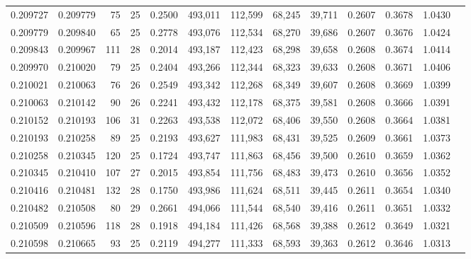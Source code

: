 \begin{tabular}{rrrrrrrrrrrrr}
0.209727 & 0.209779 &  75 &  25 &                                     0.2500 & 493,011 & 112,599 &  68,245 &  39,711 & 0.2607 & 0.3678 & 1.0430 \\
0.209779 & 0.209840 &  65 &  25 &                                     0.2778 & 493,076 & 112,534 &  68,270 &  39,686 & 0.2607 & 0.3676 & 1.0424 \\
0.209843 & 0.209967 & 111 &  28 &                                     0.2014 & 493,187 & 112,423 &  68,298 &  39,658 & 0.2608 & 0.3674 & 1.0414 \\
0.209970 & 0.210020 &  79 &  25 &                                     0.2404 & 493,266 & 112,344 &  68,323 &  39,633 & 0.2608 & 0.3671 & 1.0406 \\
0.210021 & 0.210063 &  76 &  26 &                                     0.2549 & 493,342 & 112,268 &  68,349 &  39,607 & 0.2608 & 0.3669 & 1.0399 \\
0.210063 & 0.210142 &  90 &  26 &                                     0.2241 & 493,432 & 112,178 &  68,375 &  39,581 & 0.2608 & 0.3666 & 1.0391 \\
0.210152 & 0.210193 & 106 &  31 &                                     0.2263 & 493,538 & 112,072 &  68,406 &  39,550 & 0.2608 & 0.3664 & 1.0381 \\
0.210193 & 0.210258 &  89 &  25 &                                     0.2193 & 493,627 & 111,983 &  68,431 &  39,525 & 0.2609 & 0.3661 & 1.0373 \\
0.210258 & 0.210345 & 120 &  25 &                                     0.1724 & 493,747 & 111,863 &  68,456 &  39,500 & 0.2610 & 0.3659 & 1.0362 \\
0.210345 & 0.210410 & 107 &  27 &                                     0.2015 & 493,854 & 111,756 &  68,483 &  39,473 & 0.2610 & 0.3656 & 1.0352 \\
0.210416 & 0.210481 & 132 &  28 &                                     0.1750 & 493,986 & 111,624 &  68,511 &  39,445 & 0.2611 & 0.3654 & 1.0340 \\
0.210482 & 0.210508 &  80 &  29 &                                     0.2661 & 494,066 & 111,544 &  68,540 &  39,416 & 0.2611 & 0.3651 & 1.0332 \\
0.210509 & 0.210596 & 118 &  28 &                                     0.1918 & 494,184 & 111,426 &  68,568 &  39,388 & 0.2612 & 0.3649 & 1.0321 \\
0.210598 & 0.210665 &  93 &  25 &                                     0.2119 & 494,277 & 111,333 &  68,593 &  39,363 & 0.2612 & 0.3646 & 1.0313 \\

\end{tabular}
